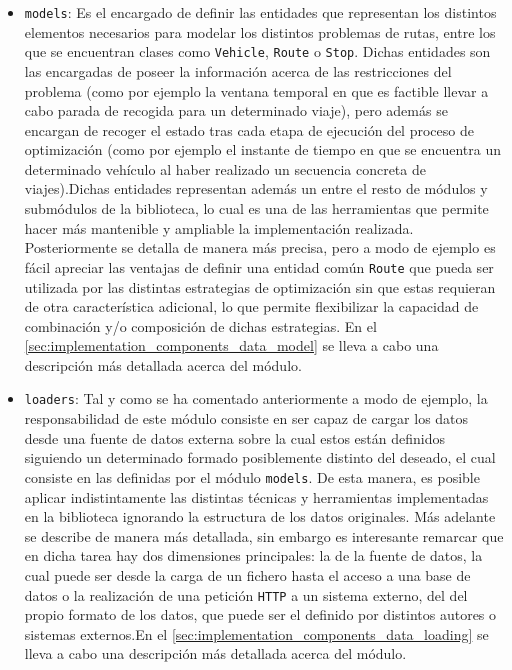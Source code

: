 \documentclass{subfiles}
\begin{document}
          \begin{itemize}
              \item \texttt{models}: Es el encargado de definir las entidades que representan los distintos elementos necesarios para modelar los distintos problemas de rutas, entre los que se encuentran clases como \texttt{Vehicle}, \texttt{Route} o \texttt{Stop}. Dichas entidades son las encargadas de poseer la información acerca de las restricciones del problema (como por ejemplo la ventana temporal en que es factible llevar a cabo parada de recogida para un determinado viaje), pero además se encargan de recoger el estado tras cada etapa de ejecución del proceso de optimización (como por ejemplo el instante de tiempo en que se encuentra un determinado vehículo al haber realizado un secuencia concreta de viajes).Dichas entidades representan además un  entre el resto de módulos y submódulos de la biblioteca, lo cual es una de las herramientas que permite hacer más mantenible y ampliable la implementación realizada. Posteriormente se detalla de manera más precisa, pero a modo de ejemplo es fácil apreciar las ventajas de definir una entidad común \texttt{Route} que pueda ser utilizada por las distintas estrategias de optimización sin que estas requieran de otra característica adicional, lo que permite flexibilizar la capacidad de combinación y/o composición de dichas estrategias. En el \cref{sec:implementation_components_data_model} se lleva a cabo una descripción más detallada acerca del módulo.

              \item \texttt{loaders}: Tal y como se ha comentado anteriormente a modo de ejemplo, la responsabilidad de este módulo consiste en ser capaz de cargar los datos desde una fuente de datos externa sobre la cual estos están definidos siguiendo un determinado formado posiblemente distinto del deseado, el cual consiste en las definidas por el módulo \texttt{models}. De esta manera, es posible aplicar indistintamente las distintas técnicas y herramientas implementadas en la biblioteca ignorando la estructura de los datos originales. Más adelante se describe de manera más detallada, sin embargo es interesante remarcar que en dicha tarea hay dos dimensiones principales: la  de la fuente de datos, la cual puede ser desde la carga de un fichero hasta el acceso a una base de datos o la realización de una petición \texttt{HTTP} a un sistema externo, del  del propio formato de los datos, que puede ser el definido por distintos autores o sistemas externos.En el \cref{sec:implementation_components_data_loading} se lleva a cabo una descripción más detallada acerca del módulo.


\end{itemize}
\end{document}

